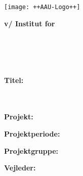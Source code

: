 

\cleardoublepage
{}
{}
\thispagestyle{empty}

\begin{minipage}[t]{0.48\textwidth}
\vspace*{-25pt}
\texttt{[image: ++AAU-Logo++]}
\end{minipage}
\hfill
\begin{minipage}[t]{0.48\textwidth}
{\small 
\textbf{v/ Institut for\\
\institutionname}\\
\studyname\\
\adress\\
\city\\
}
\end{minipage}
%
\vspace*{1cm}
%
\begin{minipage}[t]{0.48\textwidth}
\textbf{Titel:} \\[5pt]\bigskip\hspace{2ex}
\projectnam\vspace{-2.75ex}\\\bigskip \hspace{2ex}
\projectname\vspace{-2.75ex}\\ \hspace{2ex}

%
\textbf{Projekt:} \\[5pt]\bigskip\hspace{2ex}
\semestername

\textbf{Projektperiode:} \\[5pt]\bigskip\hspace{2ex} \projectperiod

\textbf{Projektgruppe:} \\[5pt]\bigskip\hspace{2ex}
\groupname


\textbf{Vejleder:} \\[5pt]\hspace*{2ex}
\supervisor \\\hspace*{2ex}

\end{minipage}
